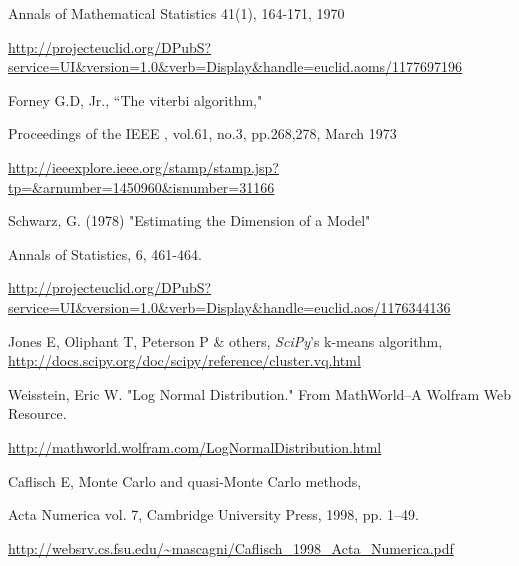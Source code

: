 \documentclass{report}
\begin{document}
\begin{thebibliography}{9}
Annals of Mathematical Statistics 41(1), 164-171, 1970

\url{http://projecteuclid.org/DPubS?service=UI&version=1.0&verb=Display&handle=euclid.aoms/1177697196}

 Forney G.D, Jr., ``The viterbi algorithm,"

Proceedings of the IEEE , vol.61, no.3, pp.268,278, March 1973

\url{http://ieeexplore.ieee.org/stamp/stamp.jsp?tp=&arnumber=1450960&isnumber=31166}

 Schwarz, G. (1978) "Estimating the Dimension of a Model"

Annals of Statistics, 6, 461-464.

\url{http://projecteuclid.org/DPubS?service=UI&version=1.0&verb=Display&handle=euclid.aos/1176344136}

 Jones E, Oliphant T, Peterson P \& others, \emph{SciPy}'s k-means algorithm, \url{http://docs.scipy.org/doc/scipy/reference/cluster.vq.html}

 Weisstein, Eric W. "Log Normal Distribution." From MathWorld--A Wolfram Web Resource.

\url{http://mathworld.wolfram.com/LogNormalDistribution.html}

 Caflisch E, Monte Carlo and quasi-Monte Carlo methods,

Acta Numerica vol. 7, Cambridge University Press, 1998, pp. 1–49.

\url{http://websrv.cs.fsu.edu/~mascagni/Caflisch_1998_Acta_Numerica.pdf}

\end{thebibliography}
\end{document}

